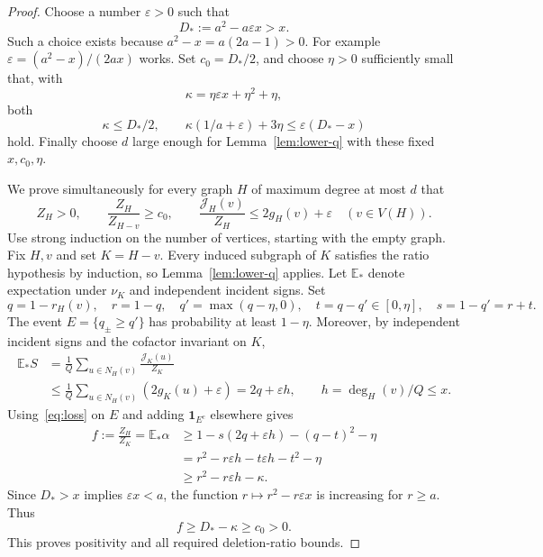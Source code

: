 \documentclass[11pt]{article}
\numberwithin{equation}{section}
\theoremstyle{remark}
\newcommand{\E}{\mathbb E}
\begin{document}
\begin{proof}

Choose a number $\varepsilon>0$ such that
\[
 D_*:=a^2-a\varepsilon x>x.
\]
Such a choice exists because $a^2-x=a(2a-1)>0$.
For example $\varepsilon=(a^2-x)/(2ax)$ works.
Set $c_0=D_*/2$, and choose $\eta>0$ sufficiently small that, with
\[
 \kappa=\eta\varepsilon x+\eta^2+\eta,
\]
both
\begin{equation}\label{eq:parameters}
 \kappa\le D_*/2,\qquad
 \kappa(1/a+\varepsilon)+3\eta
 \le\varepsilon(D_*-x)
\end{equation}
hold. Finally choose $d$ large enough for Lemma~\ref{lem:lower-q}
with these fixed $x,c_0,\eta$.

We prove simultaneously for every graph $H$ of maximum degree at
most $d$ that
\begin{equation}\label{eq:invariants}
 Z_H>0,\qquad
 \frac{Z_H}{Z_{H-v}}\ge c_0,\qquad
 \frac{\mathcal J_H(v)}{Z_H}\le2g_H(v)+\varepsilon
 \quad(v\in V(H)).
\end{equation}
Use strong induction on the number of vertices, starting with the
empty graph. Fix $H,v$ and set $K=H-v$. Every induced subgraph of
$K$ satisfies the ratio hypothesis by induction, so
Lemma~\ref{lem:lower-q} applies. Let $\E_*$ denote expectation under
$\nu_K$ and independent incident signs. Set
\[
 q=1-r_H(v),\quad r=1-q,\quad
 q'=\max(q-\eta,0),\quad t=q-q'\in[0,\eta],\quad s=1-q'=r+t.
\]
The event $E=\{q_\pm\ge q'\}$ has probability at least $1-\eta$.
Moreover, by independent incident signs and the cofactor invariant
on $K$,
\begin{align}
 \E_*S
 &=\frac1Q\sum_{u\in N_H(v)}\frac{\mathcal J_K(u)}{Z_K}
 \nonumber\\
 &\le\frac1Q\sum_{u\in N_H(v)}(2g_K(u)+\varepsilon)
 =2q+\varepsilon h,\qquad h=\deg_H(v)/Q\le x.
 \label{eq:mean-S}
\end{align}
Using~\eqref{eq:loss} on $E$ and adding $\mathbf1_{E^c}$ elsewhere
gives
\begin{align*}
 f:=\frac{Z_H}{Z_K}=\E_*\alpha
 &\ge1-s(2q+\varepsilon h)-(q-t)^2-\eta\\
 &=r^2-r\varepsilon h-t\varepsilon h-t^2-\eta\\
 &\ge r^2-r\varepsilon h-\kappa.
\end{align*}
Since $D_*>x$ implies $\varepsilon x<a$, the function
$r\mapsto r^2-r\varepsilon x$ is increasing for $r\ge a$.
Thus
\begin{equation}\label{eq:f-lower}
 f\ge D_*-\kappa\ge c_0>0.
\end{equation}
This proves positivity and all required deletion-ratio bounds.


\end{proof}
\end{document}

